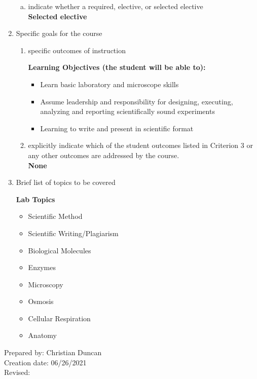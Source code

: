 \begin{enumerate}[1.]
\begin{enumerate}[a.]
\item indicate whether a required, elective, or selected elective\\ %
  {\bfseries
    Selected elective
  }

\end{enumerate}

\item Specific goals for the course
\begin{enumerate}
\item specific outcomes of instruction\\ %
  {\bfseries
    Learning Objectives (the student will be able to):
    \begin{itemize}
      \item Learn basic laboratory and microscope skills
      \item Assume leadership and responsibility for designing, executing, analyzing and reporting scientifically sound experiments
      \item Learning to write and present in scientific format
      \end{itemize}
  }

\item explicitly indicate which of the student outcomes listed in Criterion 3 or any other outcomes are addressed by the course.\\
  {\bfseries
    None
  }
\end{enumerate}

\item Brief list of topics to be covered\\
  {\bfseries
    Lab Topics
    \begin{itemize}
    \item Scientific Method
    \item Scientific Writing/Plagiarism
    \item Biological Molecules
    \item Enzymes
    \item Microscopy
    \item Osmosis
    \item Cellular Respiration
    \item Anatomy
    \end{itemize}
  }

\end{enumerate}

\noindent Prepared by: Christian Duncan\\
\noindent Creation date: 06/26/2021\\
\noindent Revised:\\
